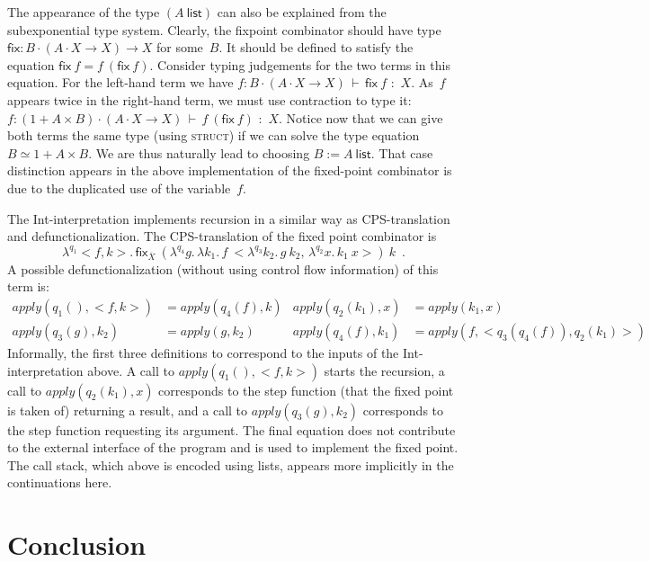 \documentclass{LMCS}
\theoremstyle{definition}
\theoremstyle{plain}
\newcommand{\lollipop}{\to}
\newcommand{\kw}[1]{\mathsf{#1}}
\newcommand{\Capply}{\textit{apply}}
\newcommand{\J}[3]{#1 \colon #2 \cdot #3}
\newcommand{\R}[1]{\textsc{#1}}
\newcommand{\SeqU}[3]{#1 \,\vdash\, #2\,\, {:}\,\, #3}
\newcommand{\tlist}[1]{#1\ \kw{list}}
\newcommand{\iso}{\simeq}
\begin{document}
The appearance of the type $(\tlist A)$ can also be explained from
the subexponential type system.
Clearly, the fixpoint combinator should have type
$\kw{fix}\colon B \cdot (A\cdot X \lollipop X) \lollipop X$
for some~$B$. It should be defined to satisfy the equation
$\kw{fix}\ f = f\ (\kw{fix}\ f)$.
Consider typing judgements for the two terms in this equation.
For the left-hand term we have
$\SeqU{\J f {B} {(A\cdot X \lollipop X)}}{\kw{fix}\ f}{X}$.
As~$f$ appears twice in the right-hand term, we must use contraction
to type it:
$\SeqU{\J f {(1+A\times B)} {(A\cdot X \lollipop X)}}
{f\ (\kw{fix}\ f)}{X}$.
Notice now that we can give both terms the same type (using
\R{struct}) if we can solve the type equation $B\iso 1+A\times B$.
We are thus naturally lead to choosing $B := \tlist A$.
That case distinction appears in the above implementation of the
fixed-point combinator is due to the duplicated use of the variable~$f$. 

The Int-interpretation implements recursion in a similar way as 
CPS-translation and defunctionalization. The CPS-translation of
the fixed point combinator is
\[
  \lambda^{q_1} <f,k>.\, 
  \kw{fix}_{\overline X}\ (\lambda^{q_4} g.\, \lambda k_1.\,f\ <\lambda^{q_3} k_2.\,g\ k_2,\, \lambda^{q_2} x.\, k_1\ x>)\ k
  \enspace.
\]
A possible defunctionalization (without using control flow information)
of this term is:
\begin{align*}
  \Capply(q_1(), <f,k>) &= \Capply(q_4(f), k) 
  &
  \Capply(q_2(k_1), x) &= apply(k_1, x)
  \\
  \Capply(q_3(g), k_2) &= apply(g, k_2)
  &
  \Capply(q_4(f), k_1) &= \Capply(f, <q_3(q_4(f)), q_2(k_1)>)
\end{align*}
Informally, the first three definitions to correspond to the inputs of
the Int-interpretation above. A call to $\Capply(q_1(), <f,k>)$ starts
the recursion, a call to $\Capply(q_2(k_1), x)$ corresponds to
the step function (that the fixed point is taken of) returning a result,
and a call to $\Capply(q_3(g), k_2)$ corresponds to the step function
requesting its argument. The final equation does not contribute to the
external interface of the program and is used to implement the fixed point.
The call stack, which above is encoded using lists, appears more
implicitly in the continuations here.

\section{Conclusion}
\end{document}
